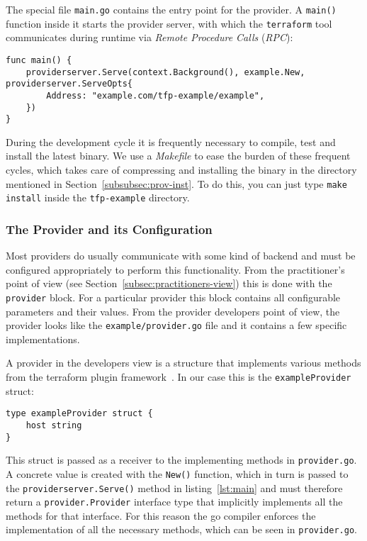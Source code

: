 \documentclass[paper=a4,11pt,numbers=noenddot]{article}
\begin{document}
The special file \verb'main.go' contains the entry point for the provider. A \verb'main()' function inside it starts the provider server, with which the \verb'terraform' tool communicates during runtime via \emph{Remote Procedure Calls} (\emph{RPC}):

\begin{lstlisting}[label=lst:main]
func main() {
    providerserver.Serve(context.Background(), example.New, providerserver.ServeOpts{
        Address: "example.com/tfp-example/example",
    })
}
\end{lstlisting}

During the development cycle it is frequently necessary to compile, test and install the latest binary. We use a \emph{Makefile} to ease the burden of these frequent cycles, which takes care of compressing and installing the binary in the directory mentioned in Section~\ref{subsubsec:prov-inst}. To do this, you can just type \verb'make install' inside the \verb'tfp-example' directory.

\subsubsection{The Provider and its Configuration}
\label{subsubsec:base-prov-conf}

Most providers do usually communicate with some kind of backend and must be configured appropriately to perform this functionality. From the practitioner's point of view (see Section~\ref{subsec:practitioners-view}) this is done with the \verb'provider' block. For a particular provider this block contains all configurable parameters and their values. From the provider developers point of view, the provider looks like the \verb'example/provider.go' file and it contains a few specific implementations.

A provider in the developers view is a structure that implements various methods from the terraform plugin framework~\autocite{noauthor_terraform_framework_nodate}. In our case this is the \verb'exampleProvider' struct:

\begin{lstlisting}
type exampleProvider struct {
	host string
}
\end{lstlisting}

This struct is passed as a receiver to the implementing methods in \verb'provider.go'. A concrete value is created with the \verb'New()' function, which in turn is passed to the \verb'providerserver.Serve()' method in listing~\ref{lst:main} and must therefore return a \verb'provider.Provider' interface type that implicitly implements all the methods for that interface. For this reason the go compiler enforces the implementation of all the necessary methods, which can be seen in \verb'provider.go'.
\end{document}
